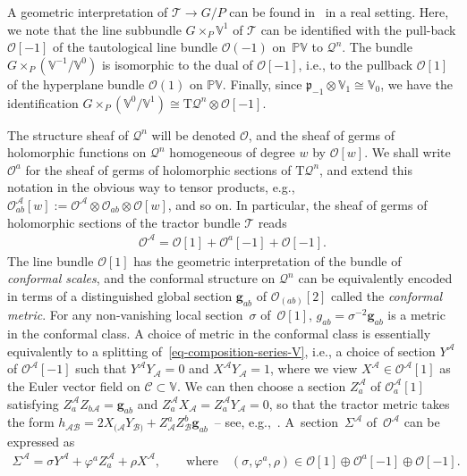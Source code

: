 \documentclass[10pt,a4paper]{amsart}
\numberwithin{equation}{section}
\newcommand{\mc} [1]{\mathcal{#1}}
\newcommand{\Tgt} {\mathrm{T}}
\newcommand{\mfp} {\mathfrak{p}}
\newcommand{\Pp} {\mathbb{P}}
\newcommand{\V} {\mathbb{V}}
\begin{document}
A geometric interpretation of $\mc{T} \rightarrow G/P$ can be found in~\cite{Curry2014} in a real setting. Here, we note that the line subbundle $G \times_P \V^1$ of $\mc{T}$ can be identif\/ied with the pull-back $\mc{O}[-1]$ of the tautological line bundle $\mc{O}(-1)$ on~$\Pp\V$ to $\mc{Q}^n$. The bundle $G \times_P \left( \V^{-1}/\V^0 \right)$ is isomorphic to the dual of $\mc{O}[-1]$, i.e., to the pullback $\mc{O}[1]$ of the hyperplane bundle $\mc{O}(1)$ on $\Pp \V$. Finally, since $\mfp_{-1} \otimes \V_1 \cong \V_0$, we have the identif\/ication $G \times_P \left( \V^0/ \V^1 \right) \cong \Tgt \mc{Q}^n \otimes \mc{O}[-1]$.

The structure sheaf of $\mc{Q}^n$ will be denoted $\mc{O}$, and the sheaf of germs of holomorphic functions on $\mc{Q}^n$ homogeneous of degree $w$ by $\mc{O}[w]$. We shall write $\mc{O}^a$ for the sheaf of germs of holomorphic sections of $\Tgt \mc{Q}^n$, and extend this notation in the obvious way to tensor products, e.g., $\mc{O}^{\mc{A}}_{ab}[w] := \mc{O}^{\mc{A}} \otimes \mc{O}_{ab} \otimes \mc{O}[w]$, and so on. In particular, the sheaf of germs of holomorphic sections of the tractor bundle $\mc{T}$ reads
\begin{gather}\label{eq-composition-series-V}
\mc{O}^\mc{A} = \mc{O}[1] + \mc{O}^a[-1] + \mc{O}[-1] .
\end{gather}
The line bundle $\mc{O}[1]$ has the geometric interpretation of the bundle of \emph{conformal scales}, and the conformal structure on $\mc{Q}^n$ can be equivalently encoded in terms of a distinguished global section $\mathbf{g}_{ab}$ of $\mc{O}_{(ab)}[2]$ called the \emph{conformal metric}. For any non-vanishing local section~$\sigma$ of~$\mc{O}[1]$, $g_{ab}=\sigma^{-2} \mathbf{g}_{ab}$ is a metric in the conformal class. A choice of metric in the conformal class is essentially equivalently to a splitting of~\eqref{eq-composition-series-V}, i.e., a choice of section $Y^\mc{A}$ of $\mc{O}^\mc{A} [-1]$ such that $Y^\mc{A} Y_\mc{A} =0$ and $X^\mc{A} Y_\mc{A} = 1$, where we view $X^\mc{A} \in \mc{O}^\mc{A} [1]$ as the Euler vector f\/ield on $\mc{C} \subset \V$. We can then choose a section $Z_a^\mc{A}$ of $\mc{O}^\mc{A}_a[1]$ satisfying $Z_a^\mc{A} Z_{b \mc{A}} = \mathbf{g}_{ab}$ and $Z_a^\mc{A} X_\mc{A} = Z_a^\mc{A} Y_\mc{A} = 0$, so that the tractor metric takes the form $h_{\mc{A} \mc{B}} = 2 X_{(\mc{A}} Y_{\mc{B})} + Z_\mc{A}^a Z_\mc{B}^b \mathbf{g}_{ab}$~-- see, e.g.,~\cite{Gover2008}. A~sec\-tion~$\Sigma^\mc{A}$ of~$\mc{O}^\mc{A}$ can be expressed as
\begin{gather}\label{eq-split-tractor}
\Sigma^\mc{A} = \sigma Y^\mc{A} + \varphi^a Z_a^\mc{A} + \rho X^\mc{A} , \qquad \text{where} \quad (\sigma,\varphi^a,\rho) \in \mc{O}[1] \oplus \mc{O}^a[-1] \oplus \mc{O}[-1].
\end{gather}
\end{document}
